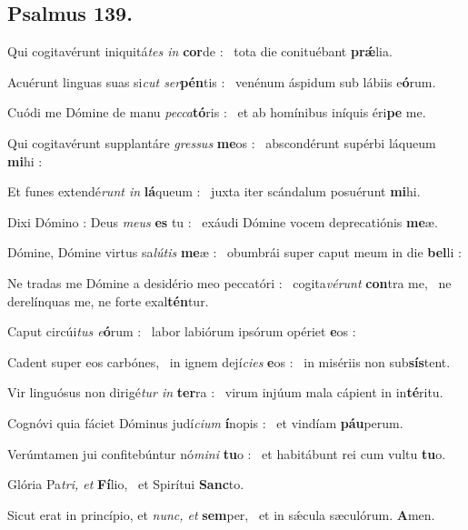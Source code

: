 \documentclass[12pt]{article} %
\def\noinitial{%
\gresetfirstlineaboveinitial{\textcolor{benred8}{\small \textsc{\textbf{}}}}{\textcolor{benred8}{\small \textsc{\textbf{}}}}
\setspaceafterinitial{0pt plus 0em minus 0em}%
\setspacebeforeinitial{0pt plus 0em minus 0em}%
\relax %
}
\newenvironment{psalmtext}{\leftskip 0.25in}{\vspace{2 mm}}
\let\oldgresixstar\gresixstar
\renewcommand{\gresixstar}{\textcolor{benred8}{\oldgresixstar}}
\let\oldgredagger\gredagger
\renewcommand{\gredagger}{\textcolor{benred8}{\oldgredagger}}
\begin{document}
\subsection*{Psalmus 139.}

{\noinitial
{}

}

\begin{psalmtext}
Qui cogitavérunt iniquitá\emph{tes in} \textbf{cor}de : \gresixstar\ tota die conituébant \textbf{prǽ}lia.

Acuérunt linguas suas si\emph{cut ser}\textbf{pén}tis : \gresixstar\ venénum áspidum sub lábiis e\textbf{ó}rum.

Cuódi me Dómine de manu \emph{pecca}\textbf{tó}ris : \gresixstar\ et ab homínibus iníquis éri\textbf{pe} me.

Qui cogitavérunt supplantáre \emph{gressus} \textbf{me}os : \gresixstar\ abscondérunt supérbi láqueum \textbf{mi}hi :

Et funes extendé\emph{runt in} \textbf{lá}queum : \gresixstar\ juxta iter scándalum posuérunt \textbf{mi}hi.

Dixi Dómino : Deus \emph{meus} \textbf{es} tu : \gresixstar\ exáudi Dómine vocem deprecatiónis \textbf{me}æ.

Dómine, Dómine virtus sa\emph{lútis} \textbf{me}æ : \gresixstar\ obumbrái super caput meum in die \textbf{bel}li :

Ne tradas me Dómine a desidério meo peccatóri : \gredagger\ cogita\emph{vérunt} \textbf{con}tra me, \gresixstar\ ne derelínquas me, ne forte exal\textbf{tén}tur.

Caput circúi\emph{tus e}\textbf{ó}rum : \gresixstar\ labor labiórum ipsórum opériet \textbf{e}os :

Cadent super eos carbónes, \gredagger\ in ignem dejí\emph{cies} \textbf{e}os : \gresixstar\ in misériis non sub\textbf{sís}tent.

Vir linguósus non dirigé\emph{tur in} \textbf{ter}ra : \gresixstar\ virum injúum mala cápient in in\textbf{té}ritu.

Cognóvi quia fáciet Dóminus judí\emph{cium} \textbf{í}nopis : \gresixstar\ et vindíam \textbf{páu}perum.

Verúmtamen jui confitebúntur nó\emph{mini} \textbf{tu}o : \gresixstar\ et habitábunt rei cum vultu \textbf{tu}o.

Glória Pa\emph{tri, et} \textbf{Fí}lio, \gresixstar\ et Spirítui \textbf{Sanc}to.

Sicut erat in princípio, et \emph{nunc, et} \textbf{sem}per, \gresixstar\ et in sǽcula sæculórum. \textbf{A}men.

\end{psalmtext}
\end{document}
